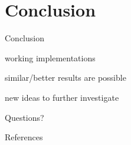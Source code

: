 \documentclass[16pt]{beamer}
\newenvironment{wideitemize}{\itemize\addtolength{\itemsep}{10pt}}{\enditemize}
\begin{document}
\section{Conclusion}

\begin{frame}{Conclusion}
\begin{wideitemize}
\item working implementations
\item similar/better results are possible
\item new ideas to further investigate
\end{wideitemize}

\end{frame}


\begin{frame}{}
\centering
\Huge{Questions?}
\end{frame}

\scriptsize
\begin{frame}[allowframebreaks]{References}


\end{frame}
\end{document}
